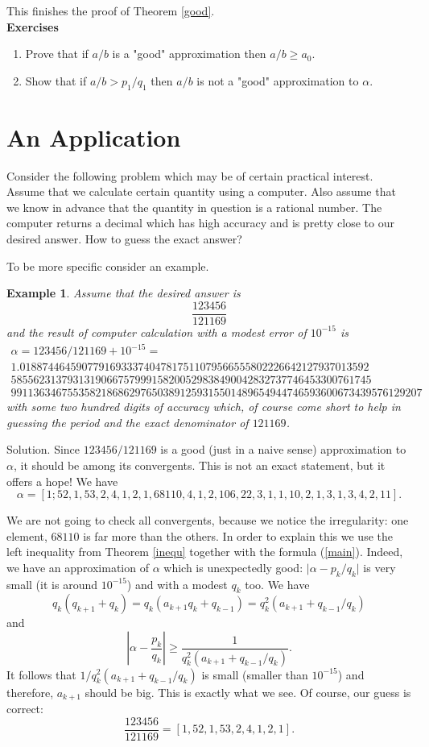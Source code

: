 \documentclass[12pt,letterpaper]{book}
\newtheorem{example}{Example}
\begin{document}
This finishes the proof of Theorem \ref{good}. \\
\textbf{Exercises}
\begin{enumerate}
\item{Prove that if $a/b$ is a "good" approximation then $a/b \geq
a_0$.}\item{Show that if $a/b>p_1/q_1$ then $a/b$ is not a "good"
approximation to $\alpha$.}
\end{enumerate}
\section{An Application}

Consider the following problem which may be of certain practical
interest. Assume that we calculate certain quantity using a
computer. Also assume that we know in advance that the quantity in
question is a rational number. The computer returns a decimal which
has high accuracy and is pretty close to our desired answer. How to
guess the exact answer?

To be more specific consider an example.
\begin{example}

Assume that the desired answer is
$$
\frac{123456}{121169}
$$
and the result of computer calculation with a modest error of
$10^{-15}$ is
$$
\begin{array}{l}
\alpha = 123456/121169 + 10^{-15} = \\
1.01887446459077916933374047817511079566555802226642127937013592 \\
5855623137931319066757999158200529838490042832737746453300761745 \\
9911363467553582186862976503891259315501489654944746593600673439576129207
\end{array}
$$
with some two hundred digits of accuracy which, of course come short
to help in guessing the period and the exact denominator of
$121169$.

\end{example}

Solution. Since $123456/121169$ is a good (just in a naive sense)
approximation to $\alpha$, it should be among its convergents. This
is not an exact statement, but it offers a hope! We have
$$
\alpha = [1; 52, 1, 53, 2, 4, 1, 2, 1, 68110, 4, 1, 2, 106, 22, 3,
1, 1, 10, 2, 1, 3, 1, 3, 4, 2, 11].
$$

We are not going to check all convergents, because we notice the
irregularity: one element, $68110$ is far more than the others. In
order to explain this we use the left inequality from Theorem
\ref{inequ} together with the formula (\ref{main}). Indeed, we have
an approximation of $\alpha$ which is unexpectedly good: $\vert
\alpha - p_k/q_k \vert$ is very small (it is around $10^{-15}$) and
with a modest $q_k$ too. We have
$$
q_k(q_{k+1} + q_k) = q_k(a_{k+1} q_k + q_{k-1}) = q_k^2(a_{k+1} +
q_{k-1}/q_k)
$$
and
$$
\left\vert \alpha - \frac{p_k}{q_k} \right\vert \geq
\frac{1}{q_k^2(a_{k+1} + q_{k-1}/q_k)}.
$$
It follows that $1/q_k^2(a_{k+1} + q_{k-1}/q_k)$ is small (smaller
than $10^{-15}$) and therefore, $a_{k+1}$ should be big. This is
exactly what we see. Of course, our guess is correct:
$$
\frac{123456}{121169} = [1, 52, 1, 53, 2, 4, 1, 2, 1].
$$
\end{document}

